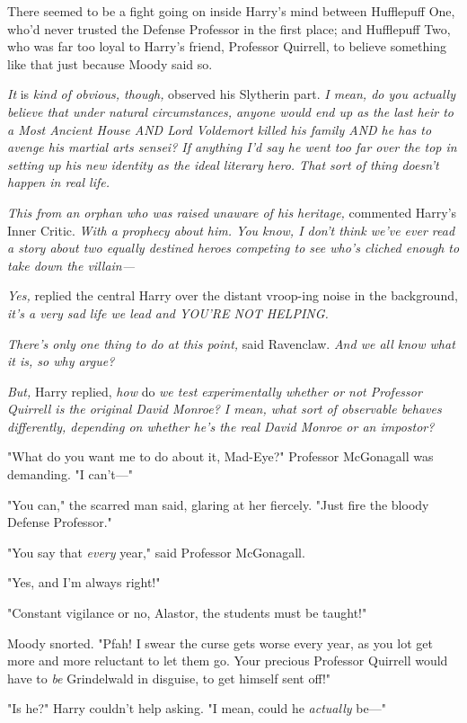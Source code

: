 There seemed to be a fight going on inside Harry's mind between Hufflepuff One,
who'd never trusted the Defense Professor in the first place; and Hufflepuff
Two, who was far too loyal to Harry's friend, Professor Quirrell, to believe
something like that just because Moody said so.

\emph{It} is \emph{kind of obvious, though,} observed his Slytherin part.
\emph{I mean, do you actually believe that under natural circumstances, anyone
would end up as the last heir to a Most Ancient House AND Lord Voldemort killed
his family AND he has to avenge his martial arts sensei? If anything I'd say he
went too far over the top in setting up his new identity as the ideal literary
hero. That sort of thing doesn't happen in real life.}

\emph{This from an orphan who was raised unaware of his heritage,} commented
Harry's Inner Critic. \emph{With a prophecy about him. You know, I don't think
we've ever read a story about two equally destined heroes competing to see
who's cliched enough to take down the villain—}

\emph{Yes,} replied the central Harry over the distant vroop-ing noise in the
background, \emph{it's a very sad life we lead and YOU'RE NOT HELPING.}

\emph{There's only one thing to do at this point,} said Ravenclaw. \emph{And we
all know what it is, so why argue?}

\emph{But,} Harry replied, \emph{how} do \emph{we test experimentally whether
or not Professor Quirrell is the original David Monroe? I mean, what sort of
observable behaves differently, depending on whether he's the real David Monroe
or an impostor?}

"What do you want me to do about it, Mad-Eye?" Professor McGonagall was
demanding. "I can't—"

"You can," the scarred man said, glaring at her fiercely. "Just fire the bloody
Defense Professor."

"You say that \emph{every} year," said Professor McGonagall.

"Yes, and I'm always right!"

"Constant vigilance or no, Alastor, the students must be taught!"

Moody snorted. "Pfah! I swear the curse gets worse every year, as you lot get
more and more reluctant to let them go. Your precious Professor Quirrell would
have to \emph{be} Grindelwald in disguise, to get himself sent off!"

"Is he?" Harry couldn't help asking. "I mean, could he \emph{actually} be—"


